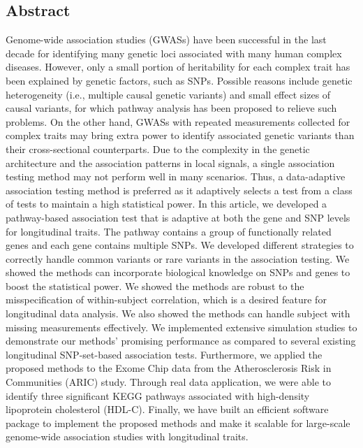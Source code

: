 \documentclass[12pt]{article}
\begin{document}
\subsection*{Abstract}
Genome-wide association studies (GWASs) have been successful in the last decade for identifying many genetic loci associated with many human complex diseases. However, only a small portion of heritability for each complex trait has been explained by genetic factors, such as SNPs. Possible reasons include genetic heterogeneity (i.e., multiple causal genetic variants) and small effect sizes of causal variants, for which pathway analysis has been proposed to relieve such problems. On the other hand, GWASs with repeated measurements collected for complex traits may bring extra power to identify associated genetic variants than their cross-sectional counterparts. Due to the complexity in the genetic architecture and the association patterns in local signals, a single association testing method may not perform well in many scenarios. Thus, a data-adaptive association testing method is preferred as it adaptively selects a test from a class of tests to maintain a high statistical power. In this article, we developed a pathway-based association test that is adaptive at both the gene and SNP levels for longitudinal traits. The pathway contains a group of functionally related genes and each gene contains multiple SNPs. We developed different strategies to correctly handle common variants or rare variants in the association testing. We showed the methods can incorporate biological knowledge on SNPs and genes to boost the statistical power. We showed the methods are robust to the misspecification of within-subject correlation, which is a desired feature for longitudinal data analysis. We also showed the methods can handle subject with missing measurements effectively. We implemented extensive simulation studies to demonstrate our methods' promising performance as compared to several existing longitudinal SNP-set-based association tests. Furthermore, we applied the proposed methods to the Exome Chip data from the Atherosclerosis Risk in Communities (ARIC) study. Through real data application, we were able to identify three significant KEGG pathways associated with high-density lipoprotein cholesterol (HDL-C). Finally, we have built an efficient software package to implement the proposed methods and make it scalable for large-scale genome-wide association studies with longitudinal traits.%
\end{document}
